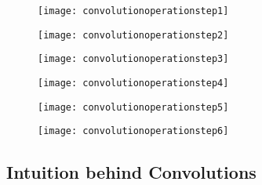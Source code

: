	\begin{figure}[tbp]
		\begin{minipage}[t]{\textwidth}
			\begin{minipage}[t]{\textwidth}
				\centering
				\texttt{[image: convolutionoperationstep1]}
				\label{fig:convolutionoperationstep1}
			\end{minipage}
			\begin{minipage}[t]{\textwidth}
				\centering
				\texttt{[image: convolutionoperationstep2]}
				\label{fig:convolutionoperationstep2}
			\end{minipage}
			\begin{minipage}[t]{\textwidth}
				\centering
				\texttt{[image: convolutionoperationstep3]}
				\label{fig:convolutionoperationstep3}
			\end{minipage}
		\end{minipage}
		\caption{}
		\label{fig:convolutionoperationstepsa}
	\end{figure}

	\begin{figure}[tbp]
		\begin{minipage}[t]{\textwidth}
			\begin{minipage}[t]{\textwidth}
				\centering
				\texttt{[image: convolutionoperationstep4]}
				\label{fig:convolutionoperationstep4}
			\end{minipage}
			\begin{minipage}[t]{\textwidth}
				\centering
				\texttt{[image: convolutionoperationstep5]}
				\label{fig:convolutionoperationstep5}
			\end{minipage}
			\begin{minipage}[t]{\textwidth}
				\centering
				\texttt{[image: convolutionoperationstep6]}
				\label{fig:convolutionoperationstep6}
			\end{minipage}
		\end{minipage}
		\caption{}
		\label{fig:convolutionoperationstepsb}
	\end{figure}

	\subsection{Intuition behind Convolutions}

